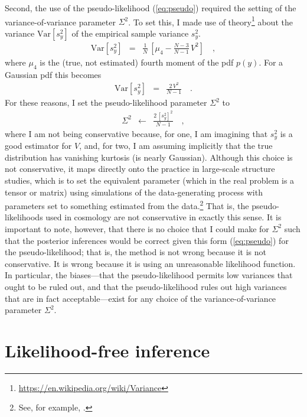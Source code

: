 \documentclass[12pt, letterpaper, preprint]{aastex}
\newcommand{\Var}{\mathrm{Var}}
\begin{document}
Second, the use of the pseudo-likelihood (\ref{eq:pseudo}) required
the setting of the variance-of-variance parameter $\Sigma^2$.
To set this, I made use of theory\footnote{\url{https://en.wikipedia.org/wiki/Variance}}
about the variance $\Var[s^2_y]$ of
the empirical sample variance $s^2_y$.
\begin{eqnarray}
\Var[s^2_y] &=& \frac{1}{N}\,\left[\mu_4 - \frac{N-3}{N-1}\,V^2\right]
\quad ,
\end{eqnarray}
where $\mu_4$ is the (true, not estimated) fourth moment of the pdf $p(y)$.
For a Gaussian pdf this becomes
\begin{eqnarray}
\Var[s^2_y] &=& \frac{2\,V^2}{N-1}
\quad .
\end{eqnarray}
For these reasons, I set the pseudo-likelihood parameter $\Sigma^2$ to
\begin{eqnarray}
\Sigma^2 &\leftarrow& \frac{2\,[s^2_y]^2}{N-1}
\label{eq:Sigma}\quad ,
\end{eqnarray}
where I am not being conservative because, for one, I am imagining
that $s^2_y$ is a good estimator for $V$, and, for two, I am 
assuming implicitly that the true distribution has vanishing kurtosis
(is nearly Gaussian).
Although this choice is not conservative, it maps directly onto the
practice in large-scale structure studies, which is to set the
equivalent parameter (which in the real problem is a tensor or matrix)
using simulations of the data-generating process with parameters set
to something estimated from the data.\footnote{See, for example, \cite{percival}.}
That is, the pseudo-likelihoods used in cosmology are not conservative
in exactly this sense.
It is important to note, however, that there is no choice that I
could make for $\Sigma^2$ such that the posterior inferences would be
correct given this form (\ref{eq:pseudo}) for the pseudo-likelihood; that is, the method
is not wrong because it is not conservative. It is wrong because it
is using an unreasonable likelihood function.
In particular, the biases---that the pseudo-likelihood permits low
variances that ought to be ruled out, and that the pseudo-likelihood
rules out high variances that are in fact acceptable---exist for any
choice of the variance-of-variance parameter $\Sigma^2$.

\section{Likelihood-free inference}
\end{document}
